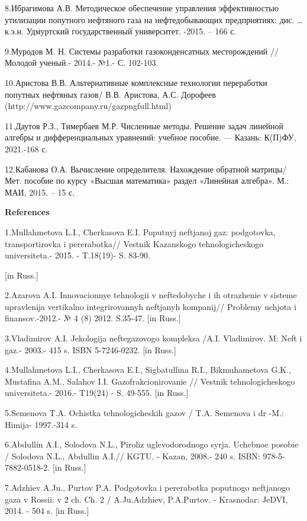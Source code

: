 8.Ибрагимова А.В. Методическое обеспечение управления эффективностью
утилизации попутного нефтяного газа на нефтедобывающих предприятиях:
дис. \ldots{} к.э.н. Удмуртский государственный университет. -2015. --
166 с.

9.Муродов М. Н. Системы разработки газоконденсатных месторождений //
Молодой ученый.- 2014.- №1.- С. 102-103.

10.Аристова В.В. Альтернативные комплексные технологии переработки
попутных нефтяных газов/ В.В. Аристова, А.С. Дорофеев
(http://www.gazcompany.ru/gazpngfull.html)

11.Даутов Р.З., Тимербаев М.Р. Численные методы. Решение задач линейной
алгебры и дифференциальных уравнений: учебное пособие. --- Казань:
К(П)ФУ, 2021.-168 с.

12.Кабанова О.А. Вычисление определителя. Нахождение обратной матрицы/
Мет. пособие по курсу «Высшая математика» раздел «Линейная алгебра». М.:
МАИ, 2015. -- 15 с.

{\bfseries References}

1.Mullahmetova L.I., Cherkasova E.I. Poputnyj neftjanoj gaz: podgotovka,
transportirovka i pererabotka// Vestnik Kazanskogo tehnologicheskogo
universiteta.- 2015. - T.18(19)- S. 83-90.

{[}in Russ.{]}

2.Azarova A.I. Innovacionnye tehnologii v neftedobyche i ih otrazhenie v
sisteme upravlenija vertikal\textquotesingle no integrirovannyh
neftjanyh kompanij// Problemy uchjota i finansov.-2012.- № 4 (8) 2012.
S.35-47. {[}in Russ.{]}

3.Vladimirov A.I. Jekologija neftegazovogo kompleksa /A.I. Vladimirov.
M: Neft\textquotesingle{} i gaz.- 2003.- 415 s. ISBN 5-7246-0232. {[}in
Russ.{]}

4.Mullahmetova L.I., Cherkasova E.I., Sigbatullina R.I., Bikmuhametova
G.K., Mustafina A.M., Salahov I.I. Gazofrakcionirovanie // Vestnik
tehnologicheskogo universiteta.- 2016.- T19(24) - S. 49-555. {[}in
Russ.{]}

5.Semenova T.A. Ochistka tehnologicheskih gazov / T.A. Semenova i dr
-M.: Himija- 1997.-314 s.

6.Abdullin A.I., Solodova N.L., Piroliz uglevodorodnogo
syr\textquotesingle ja. Uchebnoe posobie / Solodova N.L., Abdullin
A.I.// KGTU. - Kazan\textquotesingle, 2008.- 240 s. ISBN:
978-5-7882-0518-2. {[}in Russ.{]}

7.Adzhiev A.Ju., Purtov P.A. Podgotovka i pererabotka poputnogo
neftjanogo gaza v Rossii: v 2 ch. Ch. 2 / A.Ju.Adzhiev, P.A.Purtov. -
Krasnodar: JeDVI, 2014. - 504 s. {[}in Russ.{]}

